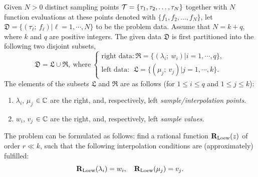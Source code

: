 


Given $N>0$ distinct sampling points ${\cal T} = \{\tau_1, \tau_2, \ldots,\tau_N\}$ together with $N$ function evaluations at these points denoted with $\{f_1, f_2, \ldots,f_N\}$, let $\mathfrak{D} = \{(\tau_\ell; \  f_\ell) \vert \ell =1,\cdots,N\}$ to be the problem data. Assume that $N=k+q$, where $k$ and $q$ are positive integers. The given data $\mathfrak{D}$ is first partitioned into the following two disjoint subsets,
\begin{equation}\label{eq:data_Loew}
\mathfrak{D} = \mathfrak{L} \cup \mathfrak{R}, \ \text{where} \ \begin{cases} {\text{right data}}: \mathfrak{R} = \{(\lambda_i; \  w_i) \vert i=1,\cdots,q
\}, \\
 {\text{left data}}: \ \ \mathfrak{L} =
\{(\mu_j; \ v_j) \vert j=1,\cdots,k\}. \end{cases}
\end{equation} 
The elements of the subsets $\mathfrak{L}$ and $\mathfrak{R}$ are as follows (for $1 \leq i \leq q$ and $1 \leq j \leq k$):
\begin{enumerate}
    \item  $\lambda_i$, $\mu_j$ $\in{\mathbb C}$ are the right, and, respectively, left \emph{sample/interpolation points}.
	\item  $w_i$, $v_j$ $\in{\mathbb C}$ are the right, and, respectively, left \emph{sample values}.
\end{enumerate}
The problem can be formulated as follows: find a rational function ${\mathbf R}_{{\mathrm{Loew}}}(z)$ of order $r \ll k$, such that the following interpolation conditions are (approximately) fulfilled:
\begin{equation} \label{eq:interp_cond}
{\mathbf R}_{{\mathrm{Loew}}}(\lambda_i)=w_i,~~~{\mathbf R}_{{\mathrm{Loew}}}(\mu_j)=v_j.
\end{equation}
